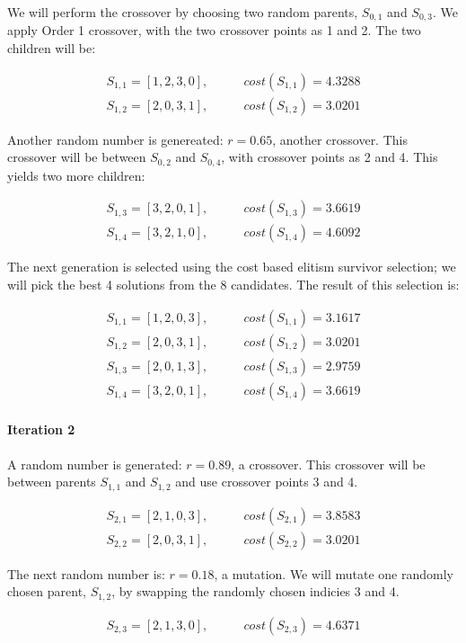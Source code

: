 \documentclass[a4paper]{article}
\newcommand{\subsubsubsection}[1]{\paragraph{#1} \mbox{}}
\begin{document}
We will perform the crossover by choosing two random parents, $S_{0,1}$ and $S_{0,3}$. We apply Order 1 crossover, with the two crossover points as 1 and 2. The two children will be:

\begin{align*}
S_{1,1} = [1, 2, 3, 0], & \qquad cost(S_{1,1}) = 4.3288 \\
S_{1,2} = [2, 0, 3, 1], & \qquad cost(S_{1,2}) = 3.0201
\end{align*}


Another random number is genereated: $r=0.65$, another crossover. This crossover will be between $S_{0,2}$ and $S_{0,4}$, with crossover points as 2 and 4. This yields two more children:

\begin{align*}
S_{1,3} = [3, 2, 0, 1], & \qquad cost(S_{1,3}) = 3.6619 \\
S_{1,4} = [3, 2, 1, 0], & \qquad cost(S_{1,4}) = 4.6092
\end{align*}


The next generation is selected using the cost based elitism survivor selection; we will pick the best 4 solutions from the 8 candidates. The result of this selection is:

\begin{align*}
S_{1,1} = [1, 2, 0, 3], & \qquad cost(S_{1,1}) = 3.1617 \\
S_{1,2} = [2, 0, 3, 1], & \qquad cost(S_{1,2}) = 3.0201 \\
S_{1,3} = [2, 0, 1, 3], & \qquad cost(S_{1,3}) = 2.9759 \\
S_{1,4} = [3, 2, 0, 1], & \qquad cost(S_{1,4}) = 3.6619
\end{align*}

\subsubsubsection{Iteration 2}
A random number is generated: $r=0.89$, a crossover. This crossover will be between parents $S_{1,1}$ and $S_{1,2}$ and use crossover points 3 and 4.

\begin{align*}
S_{2,1} = [2, 1, 0, 3], & \qquad cost(S_{2,1}) = 3.8583 \\
S_{2,2} = [2, 0, 3, 1], & \qquad cost(S_{2,2}) = 3.0201
\end{align*}

The next random number is: $r=0.18$, a mutation. We will mutate one randomly chosen parent, $S_{1,2}$, by swapping the randomly chosen indicies 3 and 4.

\begin{align*}
S_{2,3} = [2, 1, 3, 0], & \qquad cost(S_{2,3}) = 4.6371
\end{align*}
\end{document}
